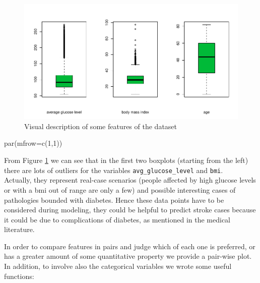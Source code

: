 \documentclass[
]{article}
\newenvironment{Shaded}{\begin{snugshade}}{\end{snugshade}}
\newcommand{\AttributeTok}[1]{\textcolor[rgb]{0.77,0.63,0.00}{#1}}
\newcommand{\DecValTok}[1]{\textcolor[rgb]{0.00,0.00,0.81}{#1}}
\newcommand{\FunctionTok}[1]{\textcolor[rgb]{0.00,0.00,0.00}{#1}}
\newcommand{\NormalTok}[1]{#1}
\begin{document}
\begin{figure}
\centering
\includegraphics{stat-project-stroke_files/figure-latex/bp-1.pdf}
\caption{\label{bp}Visual description of some features of the dataset}
\end{figure}

\begin{Shaded}
\begin{Highlighting}[]
\FunctionTok{par}\NormalTok{(}\AttributeTok{mfrow=}\FunctionTok{c}\NormalTok{(}\DecValTok{1}\NormalTok{,}\DecValTok{1}\NormalTok{))}
\end{Highlighting}
\end{Shaded}

From Figure \ref{bp} we can see that in the first two boxplots (starting
from the left) there are lots of outliers for the variables
\texttt{avg\_glucose\_level} and \texttt{bmi}.\\
Actually, they represent real-case scenarios (people affected by high
glucose levels or with a bmi out of range are only a few) and possible
interesting cases of pathologies bounded with diabetes. Hence these data
points have to be considered during modeling, they could be helpful to
predict stroke cases because it could be due to complications of
diabetes, as mentioned in the medical literature.

In order to compare features in pairs and judge which of each one is
preferred, or has a greater amount of some quantitative property we
provide a pair-wise plot. In addition, to involve also the categorical
variables we wrote some useful functions:
\end{document}
